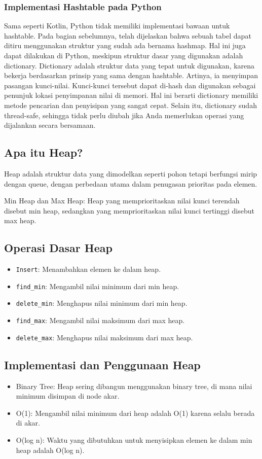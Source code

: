 \documentclass{article}
\begin{document}
\subsubsection{Implementasi Hashtable pada Python}
Sama seperti Kotlin, Python tidak memiliki implementasi bawaan untuk hashtable. Pada bagian sebelumnya, telah dijelaskan bahwa sebuah tabel dapat ditiru menggunakan struktur yang sudah ada bernama hashmap. Hal ini juga dapat dilakukan di Python, meskipun struktur dasar yang digunakan adalah dictionary. Dictionary adalah struktur data yang tepat untuk digunakan, karena bekerja berdasarkan prinsip yang sama dengan hashtable. Artinya, ia menyimpan pasangan kunci-nilai. Kunci-kunci tersebut dapat di-hash dan digunakan sebagai penunjuk lokasi penyimpanan nilai di memori. Hal ini berarti dictionary memiliki metode pencarian dan penyisipan yang sangat cepat. Selain itu, dictionary sudah thread-safe, sehingga tidak perlu diubah jika Anda memerlukan operasi yang dijalankan secara bersamaan.

\subsection{Apa itu Heap?}
Heap adalah struktur data yang dimodelkan seperti pohon tetapi berfungsi mirip dengan queue, dengan perbedaan utama dalam penugasan prioritas pada elemen.

Min Heap dan Max Heap: Heap yang memprioritaskan nilai kunci terendah disebut min heap, sedangkan yang memprioritaskan nilai kunci tertinggi disebut max heap.

\subsection{Operasi Dasar Heap}
\begin{itemize}
    \item \verb|Insert|: Menambahkan elemen ke dalam heap.
    \item \verb|find_min|: Mengambil nilai minimum dari min heap.
    \item \verb|delete_min|: Menghapus nilai minimum dari min heap.
    \item \verb|find_max|: Mengambil nilai maksimum dari max heap.
    \item \verb|delete_max|: Menghapus nilai maksimum dari max heap.
\end{itemize}

\subsection{Implementasi dan Penggunaan Heap}
\begin{itemize}
    \item Binary Tree: Heap sering dibangun menggunakan binary tree, di mana nilai minimum disimpan di node akar.
    \item O(1): Mengambil nilai minimum dari heap adalah O(1) karena selalu berada di akar.
    \item O(log n): Waktu yang dibutuhkan untuk menyisipkan elemen ke dalam min heap adalah O(log n).
\end{itemize}
\end{document}

